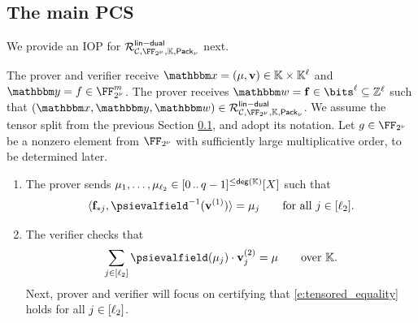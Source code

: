 \documentclass[11pt,letterpaper,usenames,dvipsnames]{article}
\begin{document}


\subsection{The main {\ftwoz}  PCS}
We provide an IOP for $\Relation^{\mathsf{lin-dual}}_{\cC, \comfield, \evalfield, \pack}$ next.
\begin{construction}\label{c:core_iop}
The prover and verifier receive $\inp=(\mu, \vv)\in \evalfield \times \evalfield^{\codedim}$ and  $\oracle= f \in \comfield^\codelength$. The prover receives $\wit= \bff\in \bits^\codedim \subseteq \ZZ^\codedim$ such that $(\inp,\oracle, \wit) \in \Relation^{\mathsf{lin-dual}}_{\cC, \comfield, \evalfield, \pack}$.  We assume the tensor split from the previous Section \ref{}, and adopt its notation. 
Let $\basegenerator\in \comfield$ be a nonzero element from $\comfield$ with sufficiently large multiplicative order, to be determined later.  


\begin{enumerate}[leftmargin=*] 
\item The prover sends $\mu_1, \ldots, \mu_{\ell_2}\in [0 \, .. \, q-1]^{\leq \mathsf{deg}(\mathbb{K})}[X]$ such that \begin{equation}\label{e:tensored_equality}\langle \bff_{*j}, \psievalfield^{-1}(\vv^{(1)})\rangle = \mu_j \qquad \text{for all } j\in [\codedim_2].\end{equation} 
\item The verifier checks that \begin{equation}\label{e:tensor_decomposition_reconstruction}\sum_{j\in [\codedim_2]} \psievalfield(\mu_j)\cdot \vv_j^{(2)}  = \mu\qquad \text{over } \evalfield.\end{equation} 
Next, prover and verifier will focus on certifying that \eqref{e:tensored_equality} holds for all $j\in [\ell_2]$.


\end{enumerate}
\end{construction}
\end{document}

